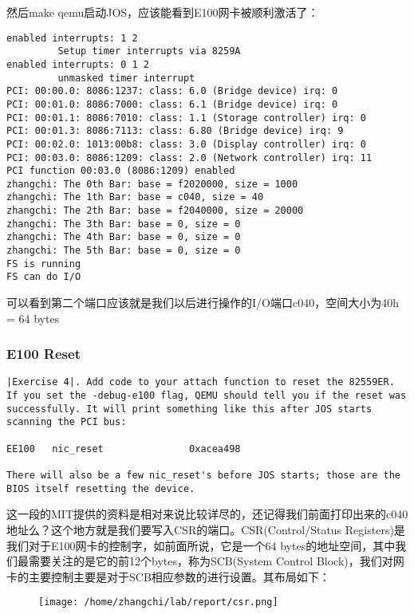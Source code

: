 \documentclass{article}
\begin{document}
\begin{CJK*}{UTF8}{gkai}
然后make qemu启动JOS，应该能看到E100网卡被顺利激活了：

\begin{lstlisting}[style=console]
enabled interrupts: 1 2
	     Setup timer interrupts via 8259A
enabled interrupts: 0 1 2
	     unmasked timer interrupt
PCI: 00:00.0: 8086:1237: class: 6.0 (Bridge device) irq: 0
PCI: 00:01.0: 8086:7000: class: 6.1 (Bridge device) irq: 0
PCI: 00:01.1: 8086:7010: class: 1.1 (Storage controller) irq: 0
PCI: 00:01.3: 8086:7113: class: 6.80 (Bridge device) irq: 9
PCI: 00:02.0: 1013:00b8: class: 3.0 (Display controller) irq: 0
PCI: 00:03.0: 8086:1209: class: 2.0 (Network controller) irq: 11
PCI function 00:03.0 (8086:1209) enabled
zhangchi: The 0th Bar: base = f2020000, size = 1000
zhangchi: The 1th Bar: base = c040, size = 40
zhangchi: The 2th Bar: base = f2040000, size = 20000
zhangchi: The 3th Bar: base = 0, size = 0
zhangchi: The 4th Bar: base = 0, size = 0
zhangchi: The 5th Bar: base = 0, size = 0
FS is running
FS can do I/O
\end{lstlisting}

可以看到第二个端口应该就是我们以后进行操作的I/O端口c040，空间大小为40h = 64 bytes


\subsubsection{E100 Reset}


\begin{lstlisting}[style=exercise]
|Exercise 4|. Add code to your attach function to reset the 82559ER. If you set the -debug-e100 flag, QEMU should tell you if the reset was successfully. It will print something like this after JOS starts scanning the PCI bus:

EE100   nic_reset               0xacea498

There will also be a few nic_reset's before JOS starts; those are the BIOS itself resetting the device.
\end{lstlisting}


这一段的MIT提供的资料是相对来说比较详尽的，还记得我们前面打印出来的c040地址么？这个地方就是我们要写入CSR的端口。CSR(Control/Status Registers)是我们对于E100网卡的控制字，如前面所说，它是一个64 bytes的地址空间，其中我们最需要关注的是它的前12个bytes，称为SCB(System Control Block)，我们对网卡的主要控制主要是对于SCB相应参数的进行设置。其布局如下：

\begin{figure}[htp]
\centering
\texttt{[image: /home/zhangchi/lab/report/csr.png]}
\end{figure}


\end{CJK*}
\end{document}
